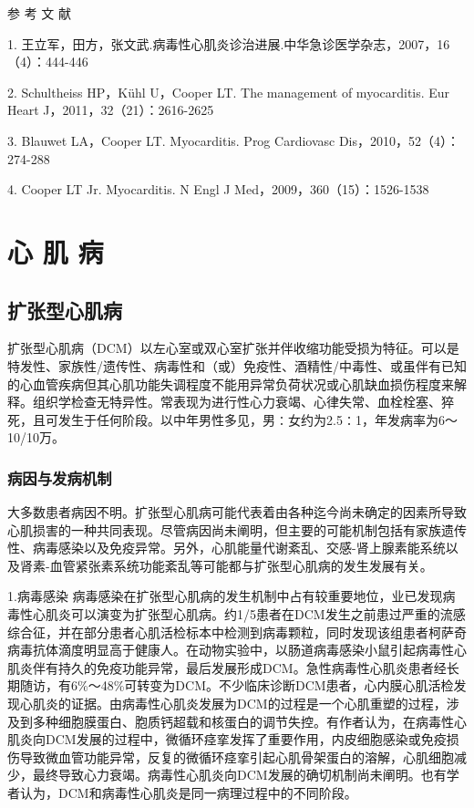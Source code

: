 \protect\hypertarget{text00305.html}{}{}

\hypertarget{text00305.htmlux5cux23CHP10-5-6}{}
参 考 文 献

1.
王立军，田方，张文武.病毒性心肌炎诊治进展.中华急诊医学杂志，2007，16（4）：444-446

2. Schultheiss HP，Kühl U，Cooper LT. The management of myocarditis. Eur
Heart J，2011，32（21）：2616-2625

3. Blauwet LA，Cooper LT. Myocarditis. Prog Cardiovasc
Dis，2010，52（4）：274-288

4. Cooper LT Jr. Myocarditis. N Engl J Med，2009，360（15）：1526-1538

\protect\hypertarget{text00306.html}{}{}

\chapter{心 肌 病}

\section{扩张型心肌病}

扩张型心肌病（DCM）以左心室或双心室扩张并伴收缩功能受损为特征。可以是特发性、家族性/遗传性、病毒性和（或）免疫性、酒精性/中毒性、或虽伴有已知的心血管疾病但其心肌功能失调程度不能用异常负荷状况或心肌缺血损伤程度来解释。组织学检查无特异性。常表现为进行性心力衰竭、心律失常、血栓栓塞、猝死，且可发生于任何阶段。以中年男性多见，男∶女约为2.5∶1，年发病率为6～10/10万。

\subsection{病因与发病机制}

大多数患者病因不明。扩张型心肌病可能代表着由各种迄今尚未确定的因素所导致心肌损害的一种共同表现。尽管病因尚未阐明，但主要的可能机制包括有家族遗传性、病毒感染以及免疫异常。另外，心肌能量代谢紊乱、交感-肾上腺素能系统以及肾素-血管紧张素系统功能紊乱等可能都与扩张型心肌病的发生发展有关。

1.病毒感染
病毒感染在扩张型心肌病的发生机制中占有较重要地位，业已发现病毒性心肌炎可以演变为扩张型心肌病。约1/5患者在DCM发生之前患过严重的流感综合征，并在部分患者心肌活检标本中检测到病毒颗粒，同时发现该组患者柯萨奇病毒抗体滴度明显高于健康人。在动物实验中，以肠道病毒感染小鼠引起病毒性心肌炎伴有持久的免疫功能异常，最后发展形成DCM。急性病毒性心肌炎患者经长期随访，有6\%～48\%可转变为DCM。不少临床诊断DCM患者，心内膜心肌活检发现心肌炎的证据。由病毒性心肌炎发展为DCM的过程是一个心肌重塑的过程，涉及到多种细胞膜蛋白、胞质钙超载和核蛋白的调节失控。有作者认为，在病毒性心肌炎向DCM发展的过程中，微循环痉挛发挥了重要作用，内皮细胞感染或免疫损伤导致微血管功能异常，反复的微循环痉挛引起心肌骨架蛋白的溶解，心肌细胞减少，最终导致心力衰竭。病毒性心肌炎向DCM发展的确切机制尚未阐明。也有学者认为，DCM和病毒性心肌炎是同一病理过程中的不同阶段。

